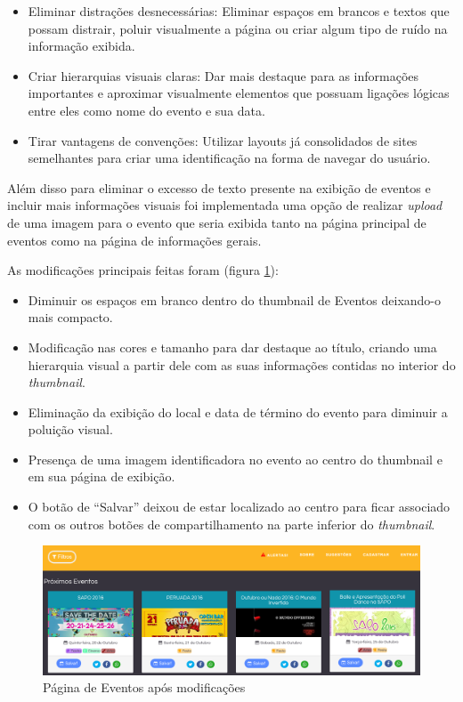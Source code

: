	\begin{itemize}
	\item Eliminar distrações desnecessárias: Eliminar espaços em brancos e textos que possam distrair, poluir visualmente a página ou criar algum tipo de ruído na informação exibida.
	\item Criar hierarquias visuais claras: Dar mais destaque para as informações importantes e aproximar visualmente elementos que possuam ligações lógicas entre eles como nome do evento e sua data.
	\item Tirar vantagens de convenções: Utilizar layouts já consolidados de sites semelhantes para criar uma identificação na forma de navegar do usuário.
\end{itemize}
	\par Além disso para eliminar o excesso de texto presente na exibição de eventos e incluir mais informações visuais foi implementada uma opção de realizar \emph{upload} de uma imagem para o evento que seria exibida tanto na página principal de eventos como na página de informações gerais.
\par As modificações principais feitas foram (figura \ref{fig:events_page_3aiteracao}):
\begin{itemize}
\item Diminuir os espaços em branco dentro do thumbnail de Eventos deixando-o mais compacto.
\item Modificação nas cores e tamanho para dar destaque ao título, criando uma hierarquia visual a partir dele com as suas informações contidas no interior do \emph{thumbnail}.
\item Eliminação da exibição do local e data de término do evento para diminuir a poluição visual.
\item Presença de uma imagem identificadora no evento ao centro do thumbnail e em sua página de exibição.
\item O botão de “Salvar” deixou de estar localizado ao centro para ficar associado com os outros botões de compartilhamento na parte inferior do \emph{thumbnail}.
\end{itemize}
\begin{figure}[htb]
\centering
\includegraphics[width=15cm]{figuras/events_page_3aiteracao}
\caption{\label{fig:events_page_3aiteracao} Página de Eventos após modificações}
\end{figure}
